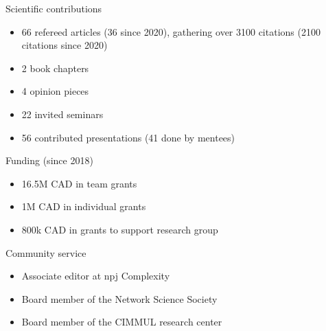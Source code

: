 \documentclass[10pt]{article}
\begin{document}
\vspace*{0.25\baselineskip}
\begin{minipage}[t]{0.56\textwidth}
  {\large\color{monbleu}Scientific contributions}
  \begin{itemize}
    \item 66 refereed articles (36 since 2020), gathering over 3100 citations (2100 citations since 2020)
    \item 2 book chapters
    \item 4 opinion pieces
    \item 22 invited seminars
    \item 56 contributed presentations (41 done by mentees)
  \end{itemize}
\end{minipage}
\hfill
\begin{minipage}[t]{0.42\textwidth}
  {\large\color{monbleu}Funding (since 2018)}
  \begin{itemize}
    \item 16.5M CAD in team grants
    \item 1M CAD in individual grants
    \item 800k CAD in grants to support research group
  \end{itemize}
  {\large\color{monbleu}Community service}
  \begin{itemize}
    \item Associate editor at npj Complexity
    \item Board member of the Network Science Society
    \item Board member of the CIMMUL research center
  \end{itemize}
\end{minipage}
\end{document}
